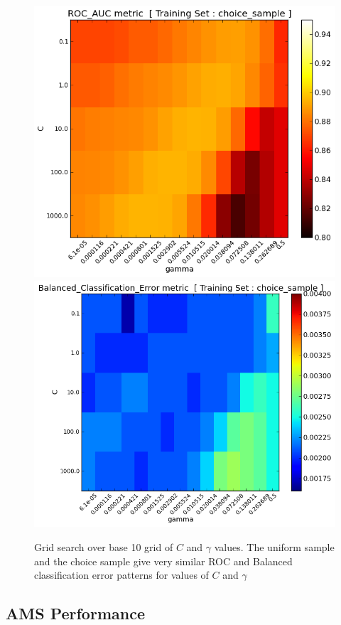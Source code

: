 \documentclass[final,3p,times,twocolumn]{elsarticle}
\begin{document}
\begin{figure}
\includegraphics[scale=0.5]{Images/ROC_AUC_choice_sample_grid2.png} 
\includegraphics[scale=0.5]{Images/Balanced_Classification_Error_choice_sample_grid2.png} 
\caption{Grid search over base 10 grid of $C$ and $\gamma$ values. The uniform sample and the choice sample give very similar ROC and Balanced classification error patterns for values of $C$ and $\gamma$}
\label{metrics_grid2}
\end{figure}

\subsection{AMS Performance}
\end{document}
